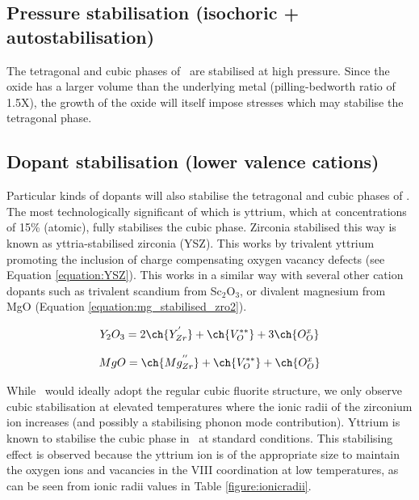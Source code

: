 \subsection{Pressure stabilisation (isochoric + autostabilisation)}

The tetragonal and cubic phases of \zirconia\ are stabilised at high pressure. Since the oxide has a larger volume than the underlying metal (pilling-bedworth ratio of 1.5X), the growth of the oxide will itself impose stresses which may stabilise the tetragonal phase.

\subsection{Dopant stabilisation (lower valence cations)}

Particular kinds of dopants will also stabilise the tetragonal and cubic phases of \zirconia. The most technologically significant of which is yttrium, which at concentrations of 15\% (atomic), fully stabilises the cubic phase. Zirconia stabilised this way is known as yttria-stabilised zirconia (YSZ). This works by trivalent yttrium promoting the inclusion of charge compensating oxygen vacancy defects (see Equation \ref{equation:YSZ}). This works in a similar way with several other cation dopants such as trivalent scandium from Sc$_{2}$O$_{3}$, or divalent magnesium from MgO (Equation \ref{equation:mg_stabilised_zro2}).

\begin{equation}
Y_{2}O_{3} = 2\ch{Y_{Zr}^{'}} + \ch{V_{O}^{**}} + 3\ch{O_{O}^{x}} 
\label{equation:YSZ}
\end{equation}

\begin{equation}
MgO= \ch{Mg_{Zr}^{''}} + \ch{V_{O}^{**}} + \ch{O_{O}^{x}} 
\label{equation:mg_stabilised_zro2}
\end{equation}

While \zirconia\ would ideally adopt the regular cubic fluorite structure, we only observe cubic stabilisation at elevated temperatures where the ionic radii of the zirconium ion increases (and possibly a stabilising phonon mode contribution). Yttrium is known to stabilise the cubic phase in \zirconia\ at standard conditions. This stabilising effect is observed because the yttrium ion is of the appropriate size to maintain the oxygen ions and vacancies in the VIII coordination at low temperatures, as can be seen from ionic radii values in Table \ref{figure:ionicradii}. 

